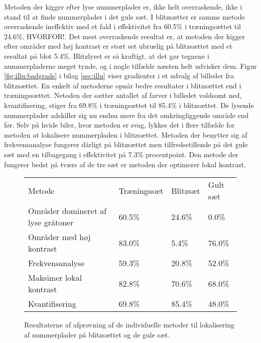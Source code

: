 Metoden der kigger efter lyse nummerplader er, ikke helt overraskende, ikke i stand til at finde nummerplader i det gule sæt. I blitzsætter er samme metode overraskende ineffektiv med et fald i effektivitet fra 60.5\% i træningsættet til 24.6\%. HVORFOR!. Det mest overraskende resultat er, at metoden der kigger efter områder med høj kontrast er stort set ubruelig på blitzsættet med et resultat på blot 5.4\%. Blitzlyset er så kraftigt, at det gør tegnene i nummerpladerne meget tynde, og i nogle tilfælde næsten helt udvisker dem. Figur \vref{fig:illu:badgrads} i bilag \ref{sec:illu} viser
gradienter i et udvalg af billeder fra blitzsættet. En enkelt af metoderne opnår bedre resultater i blitzsættet end i træningssættet. Netoden der sætter antallet af farver i billedet voldsomt ned, kvantifisering, stiger fra 69.8\% i træningsættet til 85.4\% i blitzsættet. De lysende nummerplader adskiller sig nu endnu mere fra det omkringliggende område end før. Selv på hvide biler, hvor metoden er svag, lykkes det i flere tilfælde for metoden at lokalisere nummerpladen i blitzsættet. Metoden der benytter sig af frekvensanalyse fungerer dårligt på blitzsættet men tilfredsstillende på det gule sæt med en tilbagegang i effektivitet på 7.3\% procentpoint. Den metode der fungerer bedst på tværs af de tre sæt er metoden der optimerer lokal kontrast.

\begin{figure}[htp]
\centering
\begin{tabular}{|l|l|l|l|}
\hline
\rowcolor[gray]{0.9} \multicolumn{4}{|>{\columncolor[gray]{0.9}}c|}{\textbf{Individuelle metoder til lokalisering}} \\ \hline
Metode & Træningssæt & Blitzsæt & Gult sæt\\ \hline
Områder domineret af lyse gråtoner & 60.5\% &  24.6\% & 0.0\%\\ \hline
Områder med høj kontrast & 83.0\% & 5.4\% & 76.0\%\\ \hline
Frekvensanalyse & 59.3\% &  20.8\% & 52.0\%\\ \hline
Maksimer lokal kontrast & 82.8\% &  70.6\% & 68.0\%\\ \hline
Kvantifisering & 69.8\% &  85.4\% & 48.0\%\\
\hline
\end{tabular}
\caption{Resultaterne af afprøvning af de individuelle metoder til lokalisering af nummerplader på blitzsættet og de gule sæt.}
\label{fig:test:lokalisering_blitz_gul}
\end{figure}


